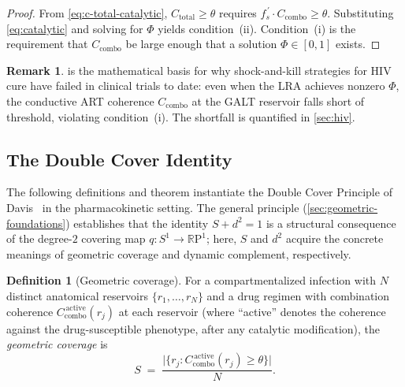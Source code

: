 \documentclass[11pt]{article}
\theoremstyle{plain}
\theoremstyle{definition}
\newtheorem{definition}[theorem]{Definition}
\newtheorem{remark}[theorem]{Remark}
\newcommand{\Ccombo}{C_{\mathrm{combo}}}
\begin{document}
\begin{proof}
From \cref{eq:c-total-catalytic}, $C_{\mathrm{total}} \geq \theta$
requires $f_s^{\,\prime} \cdot \Ccombo \geq \theta$. Substituting
\cref{eq:catalytic} and solving for $\Phi$ yields condition~(ii).
Condition~(i) is the requirement that $\Ccombo$ be large enough that
a solution $\Phi \in [0, 1]$ exists.
\end{proof}

\begin{remark}
 is the mathematical basis for why
shock-and-kill strategies for HIV cure have failed in clinical
trials to date: even when the LRA achieves nonzero $\Phi$, the
conductive ART coherence $\Ccombo$ at the GALT reservoir falls
short of threshold, violating condition~(i). The shortfall is
quantified in \cref{sec:hiv}.
\end{remark}

\subsection{The Double Cover Identity}
\label{sec:double-cover}

The following definitions and theorem instantiate the
Double Cover Principle of Davis~\cite{DavisDoubleCover}
in the pharmacokinetic setting. The general principle
(\cref{sec:geometric-foundations}) establishes that the
identity $S + d^2 = 1$ is a structural consequence of the
degree-$2$ covering map $q \colon S^1 \to
\mathbb{R}\mathrm{P}^1$; here, $S$ and $d^2$ acquire the
concrete meanings of geometric coverage and dynamic
complement, respectively.

\begin{definition}[Geometric coverage]
\label{def:S}
For a compartmentalized infection with $N$ distinct anatomical
reservoirs $\{r_1, \ldots, r_N\}$ and a drug regimen with
combination coherence $\Ccombo^{\,\mathrm{active}}(r_j)$ at each
reservoir (where ``active'' denotes the coherence against the
drug-susceptible phenotype, after any catalytic modification), the
\emph{geometric coverage} is
\begin{equation}
  \label{eq:S}
  S \;=\; \frac{\bigl|\{r_j : \Ccombo^{\,\mathrm{active}}(r_j)
  \geq \theta\}\bigr|}{N}.
\end{equation}
\end{definition}
\end{document}
